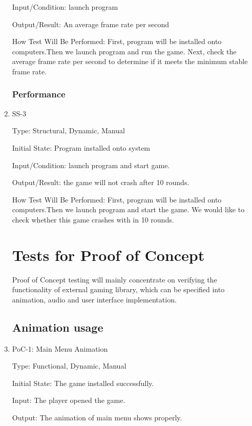 \documentclass[12pt]{article}
\begin{document}
\begin{enumerate}
    Input/Condition: launch program

    Output/Result: An average frame rate per second

    How Test Will Be Performed: First, program will be installed onto computers.Then we launch program and run the game. Next, check the average frame rate per second to determine if it meets the minimum stable frame rate.


    \subsubsection{Performance}

    \item SS-3

    Type: Structural, Dynamic, Manual

    Initial State: Program installed onto system

    Input/Condition: launch program and start game.

    Output/Result: the game will not crash after 10 rounds.

    How Test Will Be Performed: First, program will be installed onto computers.Then we launch program and start the game. We would like to check whether this game crashes with in 10 rounds. 






\section{Tests for Proof of Concept}

Proof of Concept testing will mainly concentrate on verifying the functionality of external gaming library, which can be specified into animation, audio and user interface implementation. 




\subsection{Animation usage}

	\item{PoC-1: Main Menu Animation}
					
	Type: Functional, Dynamic, Manual
					
	Initial State: The game installed successfully.
					
	Input: The player opened the game.
					
	Output: The animation of main menu shows properly.
					

\end{enumerate}
\end{document}
